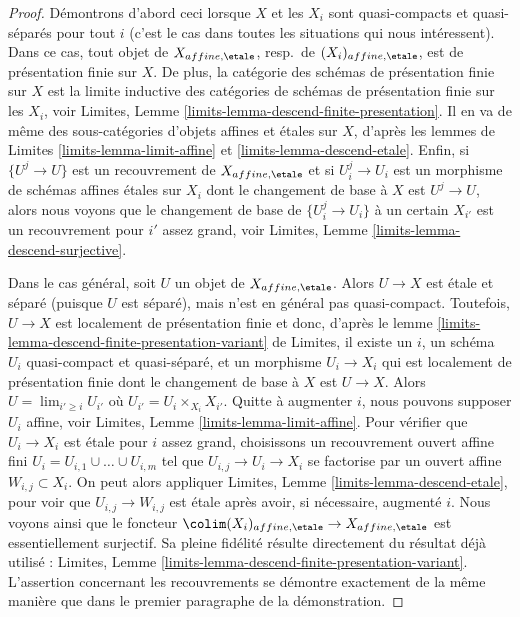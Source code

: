 \begin{proof}
D\'emontrons d'abord ceci lorsque $X$ et les $X_i$ sont quasi-compacts et
quasi-s\'epar\'es pour tout $i$ (c'est le cas dans toutes les situations qui
nous int\'eressent). Dans ce cas, tout objet de
$X_{affine, \etale}$, resp.\ de $(X_i)_{affine, \etale}$, est
de pr\'esentation finie sur $X$. De plus, la
cat\'egorie des sch\'emas de pr\'esentation finie sur $X$ est la
limite inductive des cat\'egories de sch\'emas de pr\'esentation finie
sur les $X_i$, voir
Limites, Lemme \ref{limits-lemma-descend-finite-presentation}.
Il en va de m\^eme des sous-cat\'egories d'objets affines et \'etales
sur $X$, d'apr\`es les lemmes de Limites
\ref{limits-lemma-limit-affine} et \ref{limits-lemma-descend-etale}.
Enfin, si $\{U^j \to U\}$ est un recouvrement de $X_{affine, \etale}$
et si $U_i^j \to U_i$ est un morphisme de sch\'emas affines \'etales sur
$X_i$ dont le changement de base \`a $X$ est $U^j \to U$, alors nous voyons que
le changement de base de $\{U^j_i \to U_i\}$ \`a un certain $X_{i'}$ est
un recouvrement pour $i'$ assez grand, voir
Limites, Lemme \ref{limits-lemma-descend-surjective}.

\medskip\noindent
Dans le cas g\'en\'eral, soit $U$ un objet de $X_{affine, \etale}$.
Alors $U \to X$ est \'etale et s\'epar\'e (puisque $U$ est s\'epar\'e),
mais n'est en g\'en\'eral pas quasi-compact. Toutefois, $U \to X$ est localement
de pr\'esentation finie et donc, d'apr\`es le
lemme \ref{limits-lemma-descend-finite-presentation-variant} de Limites,
il existe un $i$, un sch\'ema $U_i$ quasi-compact et quasi-s\'epar\'e, et
un morphisme $U_i \to X_i$ qui est localement de pr\'esentation finie
dont le changement de base \`a $X$ est $U \to X$. Alors $U = \lim_{i' \geq i} U_{i'}$
o\`u $U_{i'} = U_i \times_{X_i} X_{i'}$.
Quitte \`a augmenter $i$, nous pouvons supposer $U_i$ affine, voir
Limites, Lemme \ref{limits-lemma-limit-affine}.
Pour v\'erifier que $U_i \to X_i$ est \'etale pour $i$ assez grand,
choisissons un recouvrement ouvert affine fini $U_i = U_{i, 1} \cup \ldots \cup U_{i, m}$
tel que $U_{i, j} \to U_i \to X_i$ se factorise par un ouvert affine
$W_{i, j} \subset X_i$. On peut alors appliquer
Limites, Lemme \ref{limits-lemma-descend-etale},
pour voir que $U_{i, j} \to W_{i, j}$ est \'etale
apr\`es avoir, si n\'ecessaire, augment\'e $i$.
Nous voyons ainsi que le foncteur
$\colim (X_i)_{affine, \etale} \to X_{affine, \etale}$
est essentiellement surjectif. Sa pleine fid\'elit\'e r\'esulte
directement du r\'esultat d\'ej\`a utilis\'e :
Limites, Lemme \ref{limits-lemma-descend-finite-presentation-variant}.
L'assertion concernant les recouvrements se d\'emontre exactement de la m\^eme
mani\`ere que dans le premier paragraphe de la d\'emonstration.
\end{proof}

